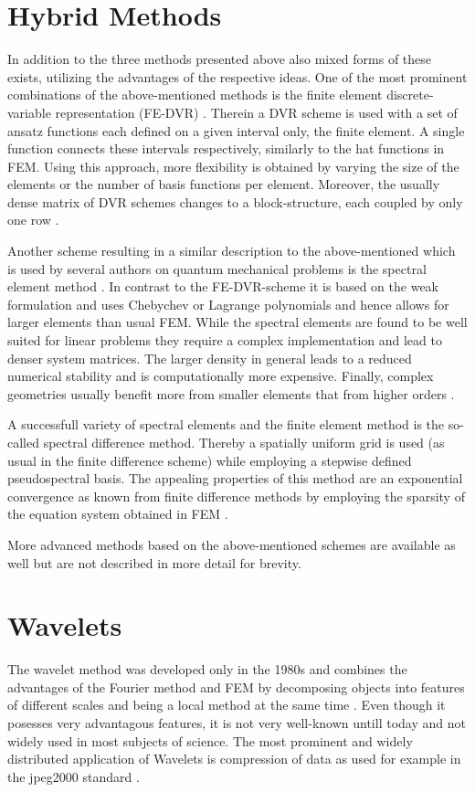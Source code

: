 \section{Hybrid Methods}
In addition to the three methods presented above also mixed forms of these exists, utilizing the advantages of the respective ideas.
One of the most prominent combinations of the above-mentioned methods is the finite element discrete-variable representation (FE-DVR) \cite{impLDVR,taoDVR}.
Therein a DVR scheme is used with a set of ansatz functions each defined on a given interval only, the finite element.
A single function connects these intervals respectively, similarly to the hat functions in FEM.
Using this approach, more flexibility is obtained by varying the size of the elements or the number of basis functions per element.
Moreover, the usually dense matrix of DVR schemes changes to a block-structure, each coupled by only one row \cite{taoDVR}.

Another scheme resulting in a similar description to the above-mentioned which is used by several authors on quantum mechanical problems is the spectral element method \cite{sem1}.
In contrast to the FE-DVR-scheme it is based on the weak formulation and uses Chebychev or Lagrange polynomials and hence allows for larger elements than usual FEM.
While the spectral elements are found to be well suited for linear problems they require a complex implementation and lead to denser system matrices.
The larger density in general leads to a reduced numerical stability and is computationally more expensive.
Finally, complex geometries usually benefit more from smaller elements that from higher orders \cite{hf_dreyer}.

A successfull variety of spectral elements and the finite element method is the so-called spectral difference method.
Thereby a spatially uniform grid is used (as usual in the finite difference scheme) while employing a stepwise defined pseudospectral basis.
The appealing properties of this method are an exponential convergence as known from finite difference methods by employing the sparsity of the equation system obtained in FEM \cite{SpectDiff}.

More advanced methods based on the above-mentioned schemes are available as well \cite{sd_mult,sd_unstructured} but are not described in more detail for brevity.

\section{Wavelets}
\label{ch:wavelet}
The wavelet method was developed only in the 1980s \cite{waveletLA} and combines the advantages of the Fourier method and FEM by decomposing objects into features of different scales and being a local method at the same time \cite{waveletLA, dahlke, FdFeWavelet}.
Even though it posesses very advantagous features, it is not very well-known untill today and not widely used in most subjects of science.
The most prominent and widely distributed application of Wavelets is compression of data as used for example in the jpeg2000 standard \cite{iso15444}.

